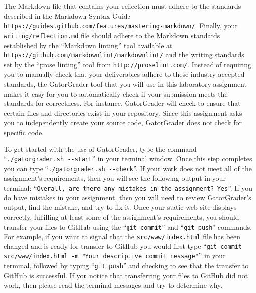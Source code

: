 \documentclass[11pt]{article}
\newcommand{\mainprogramsource}{\lstinline{src/www/index.html}}
\newcommand{\reflection}{\lstinline{writing/reflection.md}}
\newcommand{\gatorgraderstart}{\command{./gatorgrader.sh --start}}
\newcommand{\gatorgradercheck}{\command{./gatorgrader.sh --check}}
\newcommand{\gitcommit}{\command{git commit}}
\newcommand{\gitpush}{\command{git push}}
\newcommand{\gitcommitmainprogram}{\command{git commit src/www/index.html -m "Your
descriptive commit message"}}
\newcommand{\command}[1]{``\lstinline{#1}''}
\newcommand{\url}[1]{\lstinline{#1}}
\newcommand{\step}[1]{``{#1}''}
\begin{document}
The Markdown file that contains your reflection must adhere to the standards
described in the Markdown Syntax Guide
\url{https://guides.github.com/features/mastering-markdown/}. Finally, your
\reflection{} file should adhere to the Markdown standards established by the
\step{Markdown linting} tool available at
\url{https://github.com/markdownlint/markdownlint/} and the writing standards
set by the \step{prose linting} tool from \url{http://proselint.com/}. Instead
of requiring you to manually check that your deliverables adhere to these
industry-accepted standards, the GatorGrader tool that you will use in this
laboratory assignment makes it easy for you to automatically check if your
submission meets the standards for correctness. For instance, GatorGrader will
check to ensure that certain files and directories exist in your repository.
Since this assignment asks you to independently create your source code,
GatorGrader does not check for specific code.

To get started with the use of GatorGrader, type the command \gatorgraderstart{}
in your terminal window. Once this step completes you can type
\gatorgradercheck{}. If your work does not meet all of the assignment's
requirements, then you will see the following output in your terminal:
\command{Overall, are there any mistakes in the assignment? Yes}. If you do have
mistakes in your assignment, then you will need to review GatorGrader's output,
find the mistake, and try to fix it. Once your static web site displays
correctly, fulfilling at least some of the assignment's requirements, you should
transfer your files to GitHub using the \gitcommit{} and \gitpush{} commands.
For example, if you want to signal that the \mainprogramsource{} file has been
changed and is ready for transfer to GitHub you would first type
\gitcommitmainprogram{} in your terminal, followed by typing \gitpush{} and
checking to see that the transfer to GitHub is successful. If you notice that
transferring your files to GitHub did not work, then please read the terminal
messages and try to determine why.
\end{document}
